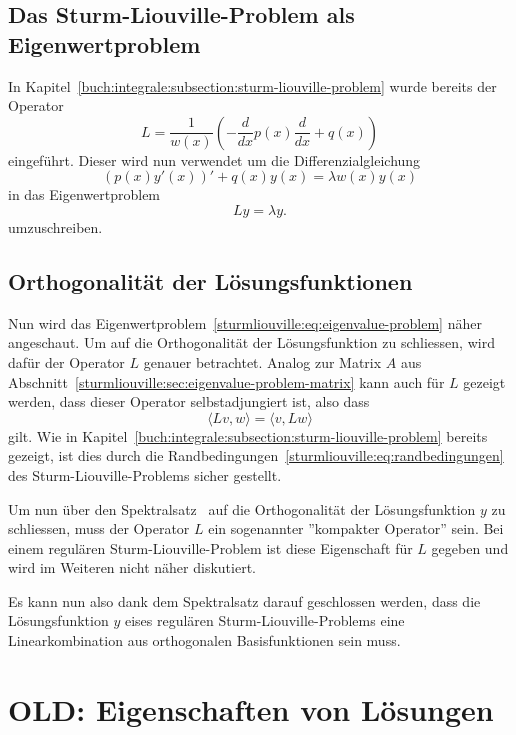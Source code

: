 \subsection{Das Sturm-Liouville-Problem als Eigenwertproblem}

In Kapitel~\ref{buch:integrale:subsection:sturm-liouville-problem} wurde bereits
der Operator
\[
    L
    =
    \frac{1}{w(x)}\left( -\frac{d}{dx}p(x) \frac{d}{dx} + q(x)\right)
\]
eingeführt.
Dieser wird nun verwendet um die Differenzialgleichung 
\[
    (p(x)y'(x))' + q(x)y(x)
    =
    \lambda w(x) y(x)
\]
in das Eigenwertproblem
\begin{equation}
    \label{sturmliouville:eq:eigenvalue-problem}
    L y
    =
    \lambda y.
\end{equation}
umzuschreiben.

\subsection{Orthogonalität der Lösungsfunktionen}

Nun wird das Eigenwertproblem~\eqref{sturmliouville:eq:eigenvalue-problem} näher
angeschaut.
Um auf die Orthogonalität der Lösungsfunktion zu schliessen, wird dafür der
Operator $L$ genauer betrachtet.
Analog zur Matrix $A$ aus 
Abschnitt~\ref{sturmliouville:sec:eigenvalue-problem-matrix} kann auch für
$L$ gezeigt werden, dass dieser Operator selbstadjungiert ist, also dass
\[
    \langle L v, w\rangle
    =
    \langle v, L w\rangle
\]
gilt.
Wie in Kapitel~\ref{buch:integrale:subsection:sturm-liouville-problem} bereits
gezeigt, ist dies durch die
Randbedingungen~\eqref{sturmliouville:eq:randbedingungen} des
Sturm-Liouville-Problems sicher gestellt.

Um nun über den Spektralsatz~\cite{sturmliouville:spektralsatz-wiki} auf die
Orthogonalität der Lösungsfunktion $y$ zu schliessen, muss der Operator $L$ ein
sogenannter ''kompakter Operator'' sein.
Bei einem regulären Sturm-Liouville-Problem ist diese Eigenschaft für $L$
gegeben und wird im Weiteren nicht näher diskutiert.

Es kann nun also dank dem Spektralsatz darauf geschlossen werden, dass die
Lösungsfunktion $y$ eises regulären Sturm-Liouville-Problems eine
Linearkombination aus orthogonalen Basisfunktionen sein muss.


\iffalse

\section{OLD: Eigenschaften von Lösungen
}

